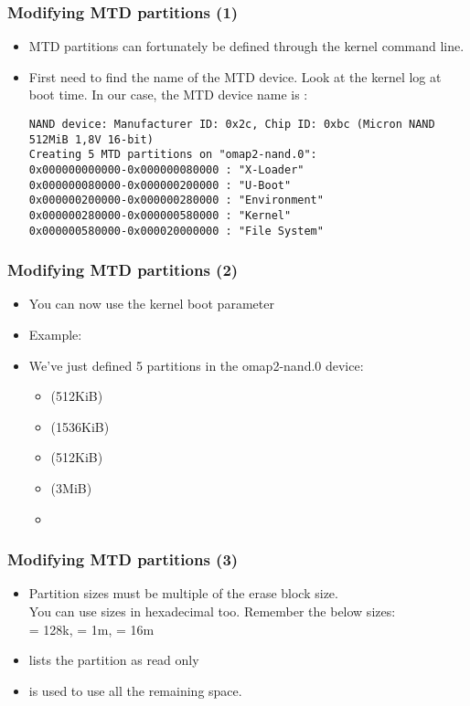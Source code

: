 \begin{frame}[fragile]
  \frametitle{Modifying MTD partitions (1)}
  \begin{itemize}
  \item MTD partitions can fortunately be defined through the kernel
    command line.
  \item First need to find the name of the MTD device. Look at the
    kernel log at boot time. In our case, the MTD device name is
    :
\small
\begin{verbatim}
NAND device: Manufacturer ID: 0x2c, Chip ID: 0xbc (Micron NAND 512MiB 1,8V 16-bit)
Creating 5 MTD partitions on "omap2-nand.0":
0x000000000000-0x000000080000 : "X-Loader"
0x000000080000-0x000000200000 : "U-Boot"
0x000000200000-0x000000280000 : "Environment"
0x000000280000-0x000000580000 : "Kernel"
0x000000580000-0x000020000000 : "File System"
\end{verbatim}
  \end{itemize}
\end{frame}

\begin{frame}
  \frametitle{Modifying MTD partitions (2)}
  \begin{itemize}
  \item You can now use the  kernel boot parameter
  \item Example:\\
  \item We've just defined 5 partitions in the omap2-nand.0 device:
    \begin{itemize}
    \item {} (512KiB)
    \item {} (1536KiB)
    \item {} (512KiB)
    \item {} (3MiB)
    \item {}
    \end{itemize}
  \end{itemize}
\end{frame}

\begin{frame}
  \frametitle{Modifying MTD partitions (3)}
  \begin{itemize}
  \item Partition sizes must be multiple of the erase block size.\\
    You can use sizes in hexadecimal too. Remember the below sizes:\\
     = 128k,  = 1m,  = 16m
  \item {} lists the partition as read only
  \item \code{-} is used to use all the remaining space.
  \end{itemize}
\end{frame}

